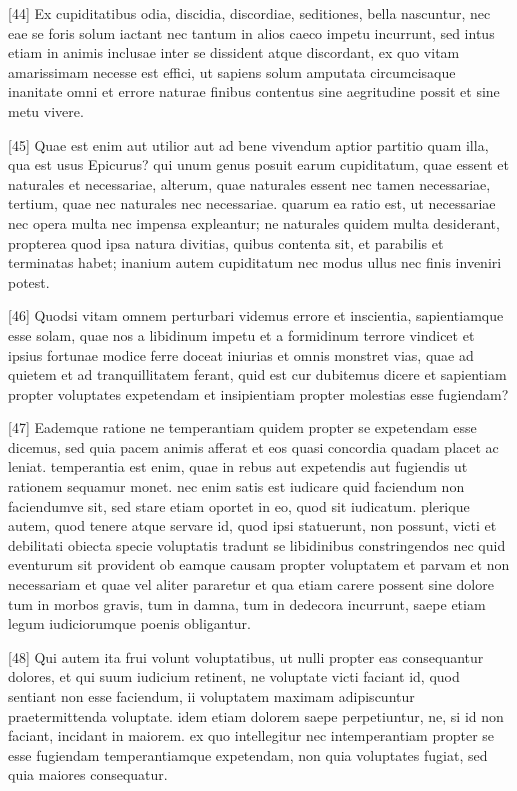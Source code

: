 \documentclass{article}
\begin{document}
[44] Ex cupiditatibus odia, discidia, discordiae, seditiones, bella nascuntur, nec eae se foris solum iactant nec tantum in alios caeco impetu incurrunt, sed intus etiam in animis inclusae inter se dissident atque discordant, ex quo vitam amarissimam necesse est effici, ut sapiens solum amputata circumcisaque inanitate omni et errore naturae finibus contentus sine aegritudine possit et sine metu vivere.

[45] Quae est enim aut utilior aut ad bene vivendum aptior partitio quam illa, qua est usus Epicurus? qui unum genus posuit earum cupiditatum, quae essent et naturales et necessariae, alterum, quae naturales essent nec tamen necessariae, tertium, quae nec naturales nec necessariae. quarum ea ratio est, ut necessariae nec opera multa nec impensa expleantur; ne naturales quidem multa desiderant, propterea quod ipsa natura divitias, quibus contenta sit, et parabilis et terminatas habet; inanium autem cupiditatum nec modus ullus nec finis inveniri potest.

[46] Quodsi vitam omnem perturbari videmus errore et inscientia, sapientiamque esse solam, quae nos a libidinum impetu et a formidinum terrore vindicet et ipsius fortunae modice ferre doceat iniurias et omnis monstret vias, quae ad quietem et ad tranquillitatem ferant, quid est cur dubitemus dicere et sapientiam propter voluptates expetendam et insipientiam propter molestias esse fugiendam?

[47] Eademque ratione ne temperantiam quidem propter se expetendam esse dicemus, sed quia pacem animis afferat et eos quasi concordia quadam placet ac leniat. temperantia est enim, quae in rebus aut expetendis aut fugiendis ut rationem sequamur monet. nec enim satis est iudicare quid faciendum non faciendumve sit, sed stare etiam oportet in eo, quod sit iudicatum. plerique autem, quod tenere atque servare id, quod ipsi statuerunt, non possunt, victi et debilitati obiecta specie voluptatis tradunt se libidinibus constringendos nec quid eventurum sit provident ob eamque causam propter voluptatem et parvam et non necessariam et quae vel aliter pararetur et qua etiam carere possent sine dolore tum in morbos gravis, tum in damna, tum in dedecora incurrunt, saepe etiam legum iudiciorumque poenis obligantur.

[48] Qui autem ita frui volunt voluptatibus, ut nulli propter eas consequantur dolores, et qui suum iudicium retinent, ne voluptate victi faciant id, quod sentiant non esse faciendum, ii voluptatem maximam adipiscuntur praetermittenda voluptate. idem etiam dolorem saepe perpetiuntur, ne, si id non faciant, incidant in maiorem. ex quo intellegitur nec intemperantiam propter se esse fugiendam temperantiamque expetendam, non quia voluptates fugiat, sed quia maiores consequatur.
\end{document}
